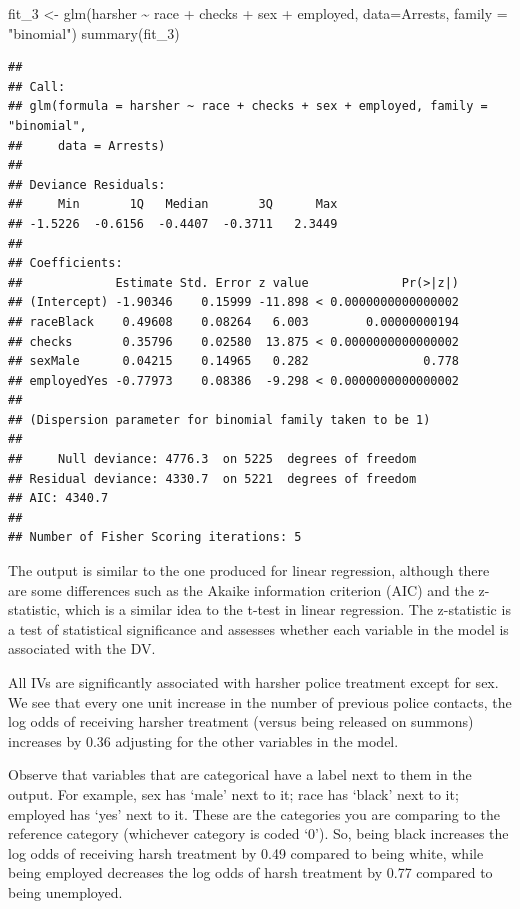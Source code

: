 \documentclass[
]{book}
\newenvironment{Shaded}{\begin{snugshade}}{\end{snugshade}}
\newcommand{\AttributeTok}[1]{\textcolor[rgb]{0.77,0.63,0.00}{#1}}
\newcommand{\FunctionTok}[1]{\textcolor[rgb]{0.00,0.00,0.00}{#1}}
\newcommand{\NormalTok}[1]{#1}
\newcommand{\OtherTok}[1]{\textcolor[rgb]{0.56,0.35,0.01}{#1}}
\newcommand{\SpecialCharTok}[1]{\textcolor[rgb]{0.00,0.00,0.00}{#1}}
\newcommand{\StringTok}[1]{\textcolor[rgb]{0.31,0.60,0.02}{#1}}
\begin{document}
\begin{Shaded}
\begin{Highlighting}[]
\NormalTok{fit\_3 }\OtherTok{\textless{}{-}} \FunctionTok{glm}\NormalTok{(harsher }\SpecialCharTok{\textasciitilde{}}\NormalTok{ race }\SpecialCharTok{+}\NormalTok{ checks }\SpecialCharTok{+}\NormalTok{ sex }\SpecialCharTok{+}\NormalTok{ employed, }\AttributeTok{data=}\NormalTok{Arrests, }\AttributeTok{family =} \StringTok{"binomial"}\NormalTok{)}
\FunctionTok{summary}\NormalTok{(fit\_3)}
\end{Highlighting}
\end{Shaded}

\begin{verbatim}
## 
## Call:
## glm(formula = harsher ~ race + checks + sex + employed, family = "binomial", 
##     data = Arrests)
## 
## Deviance Residuals: 
##     Min       1Q   Median       3Q      Max  
## -1.5226  -0.6156  -0.4407  -0.3711   2.3449  
## 
## Coefficients:
##             Estimate Std. Error z value             Pr(>|z|)
## (Intercept) -1.90346    0.15999 -11.898 < 0.0000000000000002
## raceBlack    0.49608    0.08264   6.003        0.00000000194
## checks       0.35796    0.02580  13.875 < 0.0000000000000002
## sexMale      0.04215    0.14965   0.282                0.778
## employedYes -0.77973    0.08386  -9.298 < 0.0000000000000002
## 
## (Dispersion parameter for binomial family taken to be 1)
## 
##     Null deviance: 4776.3  on 5225  degrees of freedom
## Residual deviance: 4330.7  on 5221  degrees of freedom
## AIC: 4340.7
## 
## Number of Fisher Scoring iterations: 5
\end{verbatim}

The output is similar to the one produced for linear regression, although there are some differences such as the Akaike information criterion (AIC) and the z-statistic, which is a similar idea to the t-test in linear regression. The z-statistic is a test of statistical significance and assesses whether each variable in the model is associated with the DV.

All IVs are significantly associated with harsher police treatment except for sex. We see that every one unit increase in the number of previous police contacts, the log odds of receiving harsher treatment (versus being released on summons) increases by 0.36 adjusting for the other variables in the model.

Observe that variables that are categorical have a label next to them in the output. For example, sex has `male' next to it; race has `black' next to it; employed has `yes' next to it. These are the categories you are comparing to the reference category (whichever category is coded `0'). So, being black increases the log odds of receiving harsh treatment by 0.49 compared to being white, while being employed decreases the log odds of harsh treatment by 0.77 compared to being unemployed.
\end{document}
